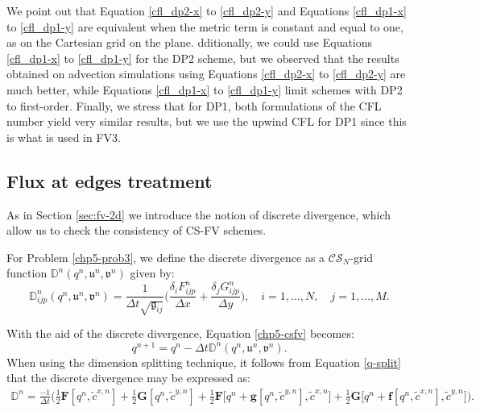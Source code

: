 We point out that Equation \eqref{cfl_dp2-x} to \eqref{cfl_dp2-y} and Equations \eqref{cfl_dp1-x} to \eqref{cfl_dp1-y} 
are equivalent when the metric term is constant and equal to one, as on the Cartesian grid on the plane.
dditionally, we could use Equations \eqref{cfl_dp1-x} to \eqref{cfl_dp1-y} for the DP2 scheme, 
but we observed that the results obtained on advection simulations using Equations \eqref{cfl_dp2-x} to \eqref{cfl_dp2-y} are much better, 
while Equations \eqref{cfl_dp1-x} to \eqref{cfl_dp1-y} limit schemes with DP2 to first-order. 
Finally, we stress that for DP1, both formulations of the CFL number yield very similar results, but we use the upwind CFL for DP1 since this is what is used in FV3.

\subsection{Flux at edges treatment}
As in Section \ref{sec:fv-2d}  we introduce the notion of discrete divergence,
which allow us to check the consistency of CS-FV schemes.
\begin{definition}
	\label{chp5-def-div}
	For Problem \ref{chp5-prob3}, we define the discrete divergence as a 
	$\mathcal{CS}_N$-grid function $\mathbb{D}^n(q^n,\mathfrak{u}^n,\mathfrak{v}^n)$
	given by:
	\begin{equation}
		\label{chp5-def-div-eq}
		\mathbb{D}_{ijp}^n(q^n,\mathfrak{u}^n,\mathfrak{v}^n)=  \frac{1}{\Delta t \sqrt{\mathfrak{g}_{ij}}}
		\bigg(\frac{\delta_i {F}_{ijp}^{n}}{\Delta x} + \frac{\delta_j {G}_{ijp}^{n}}{\Delta y}\bigg), 
		\quad i = 1, \ldots, N, \quad j=1, \ldots,M.
	\end{equation}
\end{definition}
With the aid of the discrete divergence, Equation \eqref{chp5-csfv} becomes:
\begin{equation}
	\label{chp5-def-div-eq2}
	q^{n+1} = q^n - \Delta t \mathbb{D}^n(q^n,\mathfrak{u}^n,\mathfrak{v}^n).
\end{equation}
When using the dimension splitting technique, it follows from Equation \eqref{q-split} that 
the discrete divergence may be expressed as:
\begin{align}
	\label{eqdiv-split}
	\mathbb{D}^n = \frac{-1}{\Delta t}\bigg(
 \frac{1}{2}\mathbf{F}[q^n,\tilde{c}^{x,n}] +\frac{1}{2}\mathbf{G}[q^n,\tilde{c}^{y,n}]
+\frac{1}{2}\mathbf{F}\bigg[q^n + \mathbf{g}[q^n, \tilde{c}^{y,n}], \tilde{c}^{x,n}\bigg]
+\frac{1}{2}\mathbf{G}\bigg[q^n + \mathbf{f}[q^n, \tilde{c}^{x,n}], \tilde{c}^{y,n}\bigg]\bigg).
\end{align}
